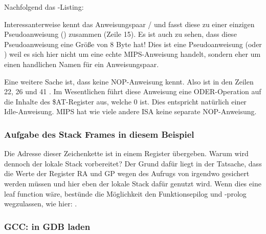 Nachfolgend das \IDA-Listing:




Interessanterweise kennt \IDA das Anweisungspaar / und fasst diese zu einer einzigen
Pseudoanweisung  () zusammen (Zeile 15).
Es ist auch zu sehen, dass diese Pseudoanweisung eine Größe von 8 Byte hat!
Dies ist eine Pseudoanweisung (oder ) weil es sich hier nicht um eine echte MIPS-Anweisung
handelt, sondern eher um einen handlichen Namen für ein Anweisungspaar.


Eine weitere Sache ist, dass \IDA keine \ac{NOP}-Anweisung kennt.
Also ist in den Zeilen 22, 26 und 41 .
Im Wesentlichen führt diese Anweisung eine ODER-Operation auf die Inhalte des \$AT-Register aus,
welche 0 ist. Dies entspricht natürlich einer Idle-Anweisung.
MIPS hat wie viele andere \ac{ISA} keine separate \ac{NOP}-Anweisung.

\subsubsection{Aufgabe des Stack Frames in diesem Beispiel}

Die Adresse dieser Zeichenkette ist in einem Register übergeben.
Warum wird dennoch der lokale Stack vorbereitet?
Der Grund dafür liegt in der Tatsache, dass die Werte der Register \ac{RA} und GP
wegen des Aufrugs von \printf irgendwo gesichert werden müssen und hier eben der
lokale Stack dafür genutzt wird.
Wenn dies eine \gls{leaf function} wäre, bestünde die Möglichkeit den Funktionsepilog
und -prolog wegzulassen, wie hier: .

\subsubsection{\Optimizing GCC: in GDB laden}


